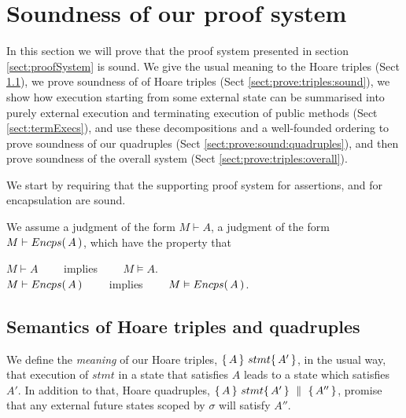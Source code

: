 
\section{Soundness of our proof system}

In this section we will prove that the proof system presented in section \ref{sect:proofSystem} is sound. We give the usual meaning to the Hoare triples (Sect \ref{sect:HLmeans}), we prove soundness of of Hoare triples (Sect \ref{sect:prove:triples:sound}), we show how execution starting from some external state can be summarised into purely external execution and terminating execution of public methods (Sect \ref{sect:termExecs}), and use these decompositions and a well-founded ordering to prove soundness of our quadruples  (Sect \ref{sect:prove:sound:quadruples}), and then prove soundness of the overall system  (Sect \ref{sect:prove:triples:overall}). 



We start by requiring  that the supporting proof system for assertions, and for encapsulation are sound.
\begin{axiom}
\label{lemma:axiom:enc:assert}
We assume a judgment of the form $M \vdash A$,  a judgment of the form $M \vdash {\ensuremath Encps(\, A\, )}$, which have the property that
\begin{center}
$M \vdash A $ \ \ \ \ implies \ \ \ \ $M \vDash A$.\\
 $M \vdash {\ensuremath Encps(\, A\, )} $ \ \ \ \ implies \ \ \ \ $M \vDash {\ensuremath Encps(\, A\, )}$.
 \end{center}
\end{axiom}


\subsection{Semantics of Hoare triples and quadruples}
\label{sect:HLmeans}

We  define the {\emph {meaning}} of  our Hoare triples, $ \{\, A \, \}\ stmt \{\, A' \, \}$,  in the usual way, \ie that execution of $stmt$ in a state that satisfies $A$ leads to a state which satisfies $A'$.  
In addition to that, Hoare quadruples, $ \{\, A \, \}\ stmt \{\, A' \, \} \, \,\parallel\,\, \{\, A'' \, \} $, promise that any external future states scoped by $\sigma$ will satisfy $A''$.


